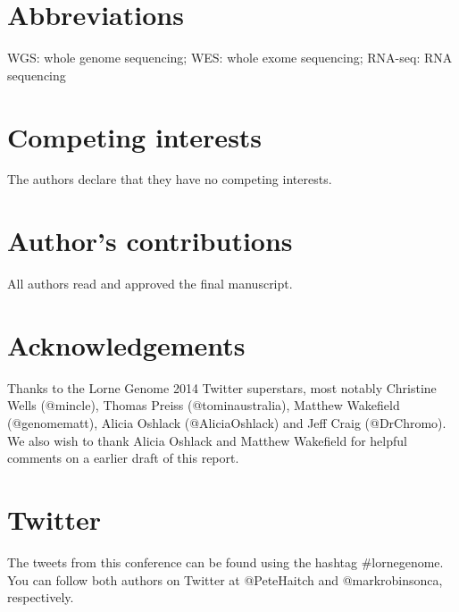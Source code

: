 \documentclass[twocolumn]{bmcart}%
\begin{document}
\begin{backmatter}

\section*{Abbreviations}
WGS: whole genome sequencing; WES: whole exome sequencing; RNA-seq: RNA sequencing

\section*{Competing interests}
  The authors declare that they have no competing interests.

\section*{Author's contributions}
All authors read and approved the final manuscript.

\section*{Acknowledgements}
Thanks to the Lorne Genome 2014 Twitter superstars, most notably Christine Wells (@mincle), Thomas Preiss (@tominaustralia), Matthew Wakefield (@genomematt), Alicia Oshlack (@AliciaOshlack) and Jeff Craig (@DrChromo).  We also wish to thank Alicia Oshlack and Matthew Wakefield for helpful comments on a earlier draft of this report.

\section*{Twitter}
The tweets from this conference can be found using the hashtag \#lornegenome. You can follow both authors on Twitter at @PeteHaitch and @markrobinsonca, respectively.



\end{backmatter}
\end{document}
